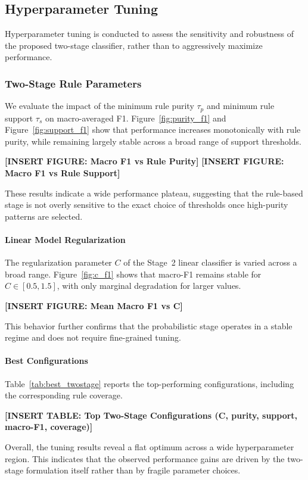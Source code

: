 \subsection{Hyperparameter Tuning}

Hyperparameter tuning is conducted to assess the sensitivity and
robustness of the proposed two-stage classifier, rather than to
aggressively maximize performance.

\subsubsection{Two-Stage Rule Parameters}
We evaluate the impact of the minimum rule purity $\tau_p$ and
minimum rule support $\tau_s$ on macro-averaged F1.
Figure~\ref{fig:purity_f1} and Figure~\ref{fig:support_f1} show that
performance increases monotonically with rule purity, while remaining
largely stable across a broad range of support thresholds.

\textbf{[INSERT FIGURE: Macro F1 vs Rule Purity]}
\textbf{[INSERT FIGURE: Macro F1 vs Rule Support]}

These results indicate a wide performance plateau, suggesting that
the rule-based stage is not overly sensitive to the exact choice of
thresholds once high-purity patterns are selected.

\paragraph{Linear Model Regularization}
The regularization parameter $C$ of the Stage~2 linear classifier is
varied across a broad range.
Figure~\ref{fig:c_f1} shows that macro-F1 remains stable for
$C \in [0.5, 1.5]$, with only marginal degradation for larger values.

\textbf{[INSERT FIGURE: Mean Macro F1 vs C]}

This behavior further confirms that the probabilistic stage operates
in a stable regime and does not require fine-grained tuning.

\paragraph{Best Configurations}
Table~\ref{tab:best_twostage} reports the top-performing configurations,
including the corresponding rule coverage.

\textbf{[INSERT TABLE: Top Two-Stage Configurations (C, purity, support, macro-F1, coverage)]}

Overall, the tuning results reveal a flat optimum across a wide
hyperparameter region.
This indicates that the observed performance gains are driven by the
two-stage formulation itself rather than by fragile parameter choices.
